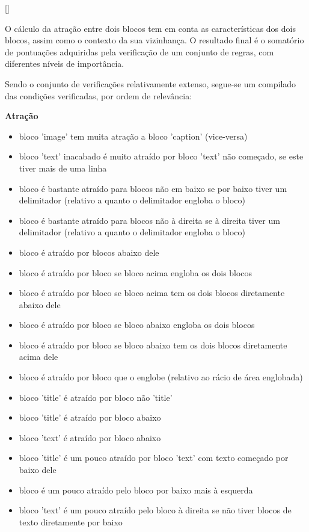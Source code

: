 [\normalsize]

O cálculo da atração entre dois blocos tem em conta as características dos dois blocos, assim como o contexto da sua vizinhança. O resultado final é o somatório de pontuações adquiridas pela verificação de um conjunto de regras, com diferentes níveis de importância. 

Sendo o conjunto de verificações relativamente extenso, segue-se um compilado das condições verificadas, por ordem de relevância:

\textbf{Atração}
\begin{itemize}\setlength\itemsep{-0.8em}
	\item bloco 'image' tem muita atração a bloco 'caption' (vice-versa)
	\item bloco 'text' inacabado é muito atraído por bloco 'text' não começado, se este tiver mais de uma linha
	\item bloco é bastante atraído para blocos não em baixo se por baixo tiver um delimitador (relativo a quanto o delimitador engloba o bloco)
	\item bloco é bastante atraído para blocos não à direita se à direita tiver um delimitador (relativo a quanto o delimitador engloba o bloco)
	\item bloco é atraído por blocos abaixo dele
	\item bloco é atraído por bloco se bloco acima engloba os dois blocos 
	\item bloco é atraído por bloco se bloco acima tem os dois blocos diretamente abaixo dele 
	\item bloco é atraído por bloco se bloco abaixo engloba os dois blocos 
	\item bloco é atraído por bloco se bloco abaixo tem os dois blocos diretamente acima dele 
	\item bloco é atraído por bloco que o englobe (relativo ao rácio de área englobada)
	\item bloco 'title' é atraído por bloco não 'title'
	\item bloco 'title' é atraído por bloco abaixo
	\item bloco 'text' é atraído por bloco abaixo
	\item bloco 'title' é um pouco atraído por bloco 'text' com texto começado por baixo dele
	\item bloco é um pouco atraído pelo bloco por baixo mais à esquerda
	\item bloco 'text' é um pouco atraído pelo bloco à direita se não tiver blocos de texto diretamente por baixo
\end{itemize}

